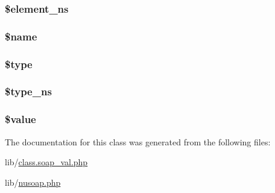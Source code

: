 \subsubsection[{\$element\+\_\+ns}]{\setlength{\rightskip}{0pt plus 5cm}\$element\+\_\+ns}\label{classsoapval_a04cba769bc1831fc7cd204c05a0f7875}
\hypertarget{classsoapval_ab2fc40d43824ea3e1ce5d86dee0d763b}{}
\subsubsection[{\$name}]{\setlength{\rightskip}{0pt plus 5cm}\$name}\label{classsoapval_ab2fc40d43824ea3e1ce5d86dee0d763b}
\hypertarget{classsoapval_a9a4a6fba2208984cabb3afacadf33919}{}
\subsubsection[{\$type}]{\setlength{\rightskip}{0pt plus 5cm}\$type}\label{classsoapval_a9a4a6fba2208984cabb3afacadf33919}
\hypertarget{classsoapval_a8595956048ac26a31428d576a6efbb6d}{}
\subsubsection[{\$type\+\_\+ns}]{\setlength{\rightskip}{0pt plus 5cm}\$type\+\_\+ns}\label{classsoapval_a8595956048ac26a31428d576a6efbb6d}
\hypertarget{classsoapval_a0f298096f322952a72a50f98a74c7b60}{}
\subsubsection[{\$value}]{\setlength{\rightskip}{0pt plus 5cm}\$value}\label{classsoapval_a0f298096f322952a72a50f98a74c7b60}


The documentation for this class was generated from the following files\+:\begin{DoxyCompactItemize}
\item 
lib/\hyperlink{class_8soap__val_8php}{class.\+soap\+\_\+val.\+php}\item 
lib/\hyperlink{nusoap_8php}{nusoap.\+php}\end{DoxyCompactItemize}
